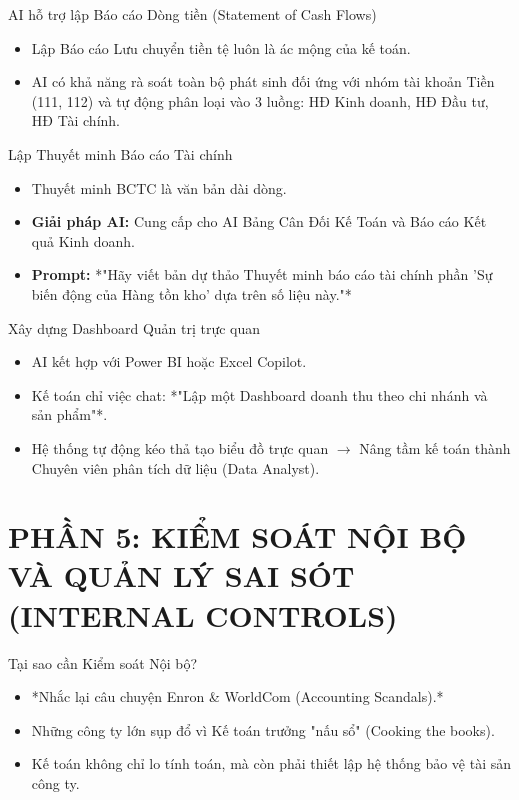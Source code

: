 \documentclass[aspectratio=169]{beamer}
\begin{document}
\begin{frame}{AI hỗ trợ lập Báo cáo Dòng tiền (Statement of Cash Flows)}
    \begin{itemize}
        \item Lập Báo cáo Lưu chuyển tiền tệ luôn là ác mộng của kế toán.
        \item AI có khả năng rà soát toàn bộ phát sinh đối ứng với nhóm tài khoản Tiền (111, 112) và tự động phân loại vào 3 luồng: HĐ Kinh doanh, HĐ Đầu tư, HĐ Tài chính.
    \end{itemize}
\end{frame}


\begin{frame}{Lập Thuyết minh Báo cáo Tài chính}
    \begin{itemize}
        \item Thuyết minh BCTC là văn bản dài dòng.
        \item \textbf{Giải pháp AI:} Cung cấp cho AI Bảng Cân Đối Kế Toán và Báo cáo Kết quả Kinh doanh.
        \item \textbf{Prompt:} *"Hãy viết bản dự thảo Thuyết minh báo cáo tài chính phần 'Sự biến động của Hàng tồn kho' dựa trên số liệu này."*
    \end{itemize}
\end{frame}


\begin{frame}{Xây dựng Dashboard Quản trị trực quan}
    \begin{itemize}
        \item AI kết hợp với Power BI hoặc Excel Copilot.
        \item Kế toán chỉ việc chat: *"Lập một Dashboard doanh thu theo chi nhánh và sản phẩm"*.
        \item Hệ thống tự động kéo thả tạo biểu đồ trực quan $\rightarrow$ Nâng tầm kế toán thành Chuyên viên phân tích dữ liệu (Data Analyst).
    \end{itemize}
\end{frame}


\section{PHẦN 5: KIỂM SOÁT NỘI BỘ VÀ QUẢN LÝ SAI SÓT (INTERNAL CONTROLS)}


\begin{frame}{Tại sao cần Kiểm soát Nội bộ?}
    \begin{itemize}
        \item *Nhắc lại câu chuyện Enron \& WorldCom (Accounting Scandals).*
        \item Những công ty lớn sụp đổ vì Kế toán trưởng "nấu sổ" (Cooking the books).
        \item Kế toán không chỉ lo tính toán, mà còn phải thiết lập hệ thống bảo vệ tài sản công ty.
    \end{itemize}
\end{frame}
\end{document}
